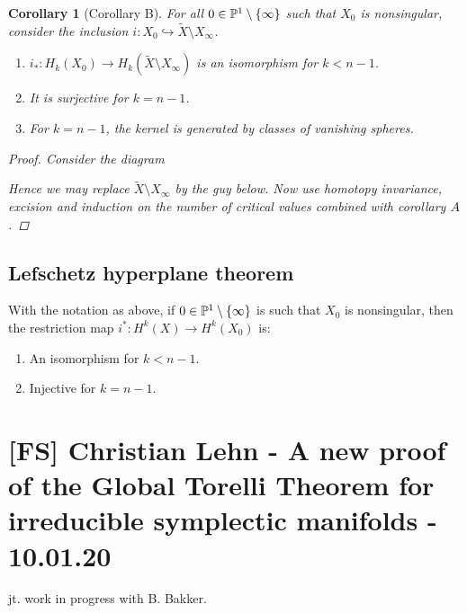\documentclass[A4paper, british]{amsart}
\theoremstyle{darkgreentheorem}
\newtheorem{cor}[thm]{Corollary}
\theoremstyle{darkbluedefinition}
\theoremstyle{darkredexample}
\theoremstyle{remark}
\newcommand{\1}{\mathbbm{1}}
\newcommand{\mono}{\hookrightarrow}
\begin{document}
\begin{cor}[Corollary B]
    For all $0\in \P^{1}\setminus \{\infty\}$ such that $X_{0}$ is nonsingular, consider the inclusion $i\colon X_{0}\mono \tilde{X}\setminus X_{\infty}$.
    \begin{enumerate}
	\item $i_{*}\colon H_{k}(X_{0})\to H_{k}(\tilde{X}\setminus X_{\infty})$ is an isomorphism for $k<n-1$.
	\item It is surjective for $k=n-1$.
	\item For $k=n-1$, the kernel is generated by classes of vanishing spheres.
    \end{enumerate}
    \begin{proof}
	Consider the diagram
	\begin{center}
	\end{center}
	Hence we may replace $\tilde{X}\setminus X_{\infty}$ by the guy below.
	Now use homotopy invariance, excision and induction on the number of critical values combined with corollary $A$.
    \end{proof}
\end{cor}


\subsection{Lefschetz hyperplane theorem}

With the notation as above, if $0\in \P^{1}\setminus\{\infty\}$ is such that $X_{0}$ is nonsingular, then the restriction map $i^{*}\colon H^{k}(X)\to H^{k}(X_{0})$ is:
\begin{enumerate}
    \item An isomorphism for $k<n-1$.
    \item Injective for $k=n-1$.
\end{enumerate}

\section{[FS] Christian Lehn - A new proof of the Global Torelli Theorem for irreducible symplectic manifolds - 10.01.20}

jt. work in progress with B. Bakker.
\end{document}
